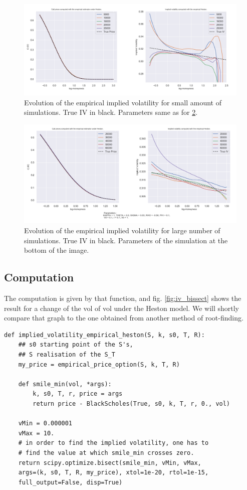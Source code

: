 \begin{figure}
\centering
\includegraphics[width = 0.95 \textwidth]{../addition_part/images/integration_fft/low_IV_empirical.png}
\caption{Evolution of the empirical implied volatility for small amount of simulations. True IV in black. Parameters same as for \ref{fig:IVempirical_evol2}.}
\label{fig:IVempirical_evol}
\end{figure}


\begin{figure}
\centering
\includegraphics[width = 0.95 \textwidth]{../addition_part/images/integration_fft/high_IV_empirical.png}
\caption{Evolution of the empirical implied volatility for large number of simulations. True IV in black. Parameters of the simulation at the bottom of the image.}
\label{fig:IVempirical_evol2}
\end{figure}



\subsection{Computation}
The computation is given by that function, and fig. \ref{fig:iv_bissect} shows the result for a change of the vol of vol under the Heston model. We will shortly compare that graph to the one obtained from another method of root-finding.

\begin{verbatim}
def implied_volatility_empirical_heston(S, k, s0, T, R):
    ## s0 starting point of the S's,
    ## S realisation of the S_T
    my_price = empirical_price_option(S, k, T, R)

    def smile_min(vol, *args):
        k, s0, T, r, price = args
        return price - BlackScholes(True, s0, k, T, r, 0., vol)

    vMin = 0.000001
    vMax = 10.
    # in order to find the implied volatility, one has to 
    # find the value at which smile_min crosses zero. 
    return scipy.optimize.bisect(smile_min, vMin, vMax, 
    args=(k, s0, T, R, my_price), xtol=1e-20, rtol=1e-15,
    full_output=False, disp=True)
\end{verbatim}


